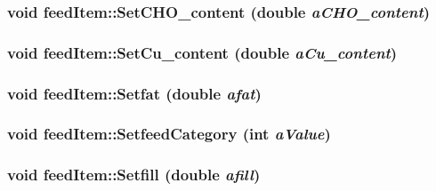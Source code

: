 \label{classfeed_item_a4e2a499cdafc37014f23df3f07dcad23}
\hypertarget{classfeed_item_aa50c44b1683a7dfb89f4af3b89cc8a84}{
\subsubsection[{SetCHO\_\-content}]{\setlength{\rightskip}{0pt plus 5cm}void feedItem::SetCHO\_\-content (double {\em aCHO\_\-content})}}
\label{classfeed_item_aa50c44b1683a7dfb89f4af3b89cc8a84}
\hypertarget{classfeed_item_a7c18d24c378e42878f02a9176d50d602}{
\subsubsection[{SetCu\_\-content}]{\setlength{\rightskip}{0pt plus 5cm}void feedItem::SetCu\_\-content (double {\em aCu\_\-content})}}
\label{classfeed_item_a7c18d24c378e42878f02a9176d50d602}
\hypertarget{classfeed_item_a07bd81603f69ad7327240ed4cbe8d5dd}{
\subsubsection[{Setfat}]{\setlength{\rightskip}{0pt plus 5cm}void feedItem::Setfat (double {\em afat})}}
\label{classfeed_item_a07bd81603f69ad7327240ed4cbe8d5dd}
\hypertarget{classfeed_item_aba08642a5aff1cc7222aaba9eb36f49a}{
\subsubsection[{SetfeedCategory}]{\setlength{\rightskip}{0pt plus 5cm}void feedItem::SetfeedCategory (int {\em aValue})}}
\label{classfeed_item_aba08642a5aff1cc7222aaba9eb36f49a}
\hypertarget{classfeed_item_a8ccb6b7516b1700a77e743ea15d778be}{
\subsubsection[{Setfill}]{\setlength{\rightskip}{0pt plus 5cm}void feedItem::Setfill (double {\em afill})}}
